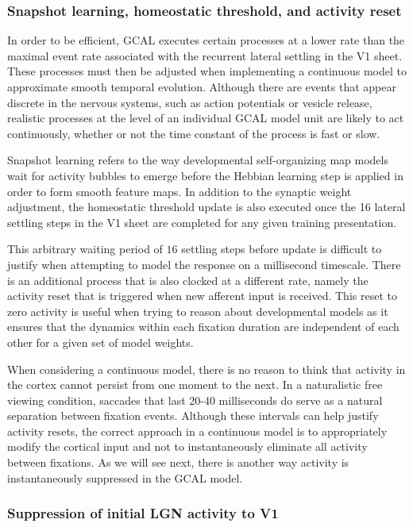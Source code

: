 \documentclass[phd,ianc,twoside]{infthesis}
\begin{document}
\subsubsection*{Snapshot learning, homeostatic threshold, and activity reset}

In order to be efficient, GCAL executes certain processes at a lower
rate than the maximal event rate associated with the recurrent lateral
settling in the V1 sheet. These processes must then be adjusted when
implementing a continuous model to approximate smooth temporal
evolution. Although there are events that appear discrete in the nervous
systems, such as action potentials or vesicle release, realistic processes
at the level of an individual GCAL model unit are likely to act
continuously, whether or not the time constant of the process is fast or
slow.

Snapshot learning refers to the way developmental self-organizing map
models wait for activity bubbles to emerge before the Hebbian learning
step is applied in order to form smooth feature maps. In addition to the
synaptic weight adjustment, the homeostatic threshold update is also
executed once the 16 lateral settling steps in the V1 sheet are
completed for any given training presentation.

This arbitrary waiting period of $16$ settling steps before update is
difficult to justify when attempting to model the response on a
millisecond timescale. There is an additional process that is also
clocked at a different rate, namely the activity reset that is triggered
when new afferent input is received. This reset to zero activity is
useful when trying to reason about developmental models as it ensures
that the dynamics within each fixation duration are independent of each
other for a given set of model weights.

When considering a continuous model, there is no reason to think that
activity in the cortex cannot persist from one moment to the next. In a
naturalistic free viewing condition, saccades that last 20-40
milliseconds do serve as a natural separation between fixation
\citep{gallant_neuroreport98} events. Although these intervals can help
justify activity resets, the correct approach in a continuous model is
to appropriately modify the cortical input and not to instantaneously
eliminate all activity between fixations. As we will see next, there
is another way activity is instantaneously suppressed in the GCAL
model.


\subsubsection*{Suppression of initial LGN activity to V1}
\end{document}
